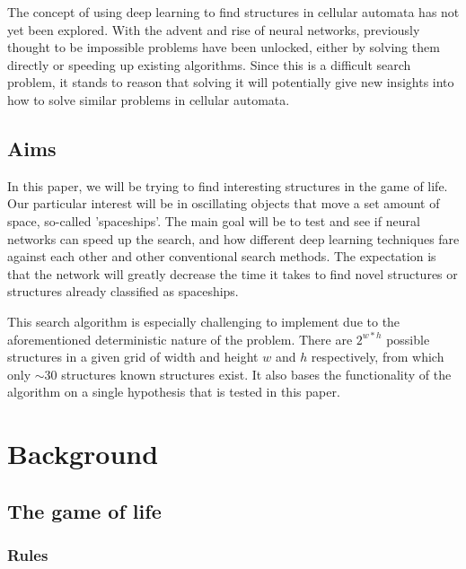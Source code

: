 \documentclass{l4proj}
\begin{document}
The concept of using deep learning to find structures in cellular automata has not yet been explored. With the advent and rise of neural networks, previously thought to be impossible problems have been unlocked, either by solving them directly or speeding up existing algorithms. Since this is a difficult search problem, it stands to reason that solving it will potentially give new insights into how to solve similar problems in cellular automata.


\section{Aims}

In this paper, we will be trying to find interesting structures in the game of life. Our particular interest will be in oscillating objects that move a set amount of space, so-called 'spaceships'. The main goal will be to test and see if neural networks can speed up the search, and how different deep learning techniques fare against each other and other conventional search methods. The expectation is that the network will greatly decrease the time it takes to find novel structures or structures already classified as spaceships.

This search algorithm is especially challenging to implement due to the aforementioned deterministic nature of the problem. There are $2^{w * h}$ possible structures in a given grid of width and height $w$ and $h$ respectively, from which only $\sim{30}$ structures known structures exist. It also bases the functionality of the algorithm on a single hypothesis that is tested in this paper. 


\chapter{Background}

\section{The game of life}

\subsection{Rules}
\end{document}
